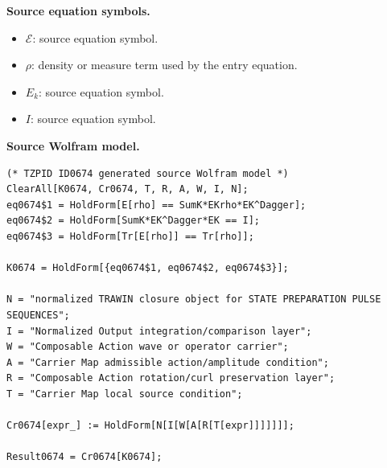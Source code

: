 \begin{minipage}[t]{0.49\linewidth}
\begingroup
\small
\raggedright
\textbf{Source equation symbols.}\par
\begin{itemize}[leftmargin=1.35em,itemsep=1pt,topsep=1pt,parsep=0pt]
    \item $\mathcal{E}$: source equation symbol.
    \item $\rho$: density or measure term used by the entry equation.
    \item $E_k$: source equation symbol.
    \item $I$: source equation symbol.
\end{itemize}
\endgroup
\end{minipage}\hfill
\begin{minipage}[t]{0.47\linewidth}
\begingroup
\scriptsize
\raggedright
\textbf{Source Wolfram model.}\par
\begin{Verbatim}[fontsize=\tiny,breaklines=true,breakanywhere=true]
(* TZPID ID0674 generated source Wolfram model *)
ClearAll[K0674, Cr0674, T, R, A, W, I, N];
eq0674$1 = HoldForm[E[rho] == SumK*EKrho*EK^Dagger];
eq0674$2 = HoldForm[SumK*EK^Dagger*EK == I];
eq0674$3 = HoldForm[Tr[E[rho]] == Tr[rho]];

K0674 = HoldForm[{eq0674$1, eq0674$2, eq0674$3}];

N = "normalized TRAWIN closure object for STATE PREPARATION PULSE SEQUENCES";
I = "Normalized Output integration/comparison layer";
W = "Composable Action wave or operator carrier";
A = "Carrier Map admissible action/amplitude condition";
R = "Composable Action rotation/curl preservation layer";
T = "Carrier Map local source condition";

Cr0674[expr_] := HoldForm[N[I[W[A[R[T[expr]]]]]]];

Result0674 = Cr0674[K0674];
\end{Verbatim}
\endgroup
\end{minipage}

